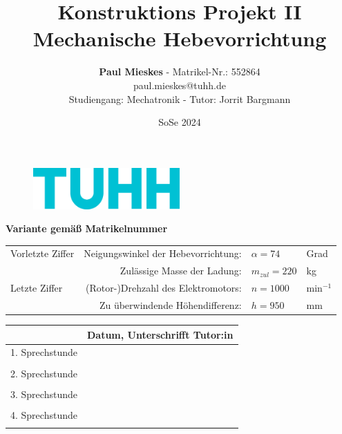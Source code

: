 \documentclass[11pt]{article} %
\title{Konstruktions Projekt II \\ \Huge \textbf{Mechanische Hebevorrichtung} }
\author{\textbf{Paul Mieskes} - Matrikel-Nr.: 552864 \\ paul.mieskes@tuhh.de \\ Studiengang: Mechatronik - Tutor: Jorrit Bargmann}
\date{SoSe 2024} %
\begin{document}
\begin{figure}
\centering
\includegraphics[width=0.5\textwidth]{pics/tuhh.png}
\end{figure}

\maketitle

\centering
\textbf{Variante gemäß Matrikelnummer}\\

\begin{tabular}{| l r l l |}
	
	\hline
	Vorletzte Ziffer & Neigungswinkel der Hebevorrichtung: & $\alpha = 74$  & Grad\\
	& Zulässige Masse der Ladung: & $m_{zul} = 220 $ & kg \\
	\hline
	Letzte Ziffer & (Rotor-)Drehzahl des Elektromotors: & $ n = 1000 $ & min$^{-1}$ \\
	& Zu überwindende Höhendifferenz: & $ h = 950 $ & mm\\
	\hline
\end{tabular}
\vspace{1.5cm}


\begin{tabular}{ | l |  m{10cm}|}
 \hline 
 & Datum, Unterschrifft Tutor:in \\
 \hline 1. Sprechstunde & \\ &\\
 \hline 2. Sprechstunde & \\& \\
 \hline 3. Sprechstunde & \\ &\\
 \hline 4. Sprechstunde & \\ &\\
 \hline
 
\end{tabular}
\thispagestyle{empty} %



\raggedright %

\newpage
{}
\renewcommand*\contentsname{Inhaltsverzeichnis}
\tableofcontents

\newpage
{}
\setcounter{page}{1} %

%
 



\end{document}
